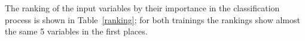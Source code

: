 
The ranking of the input variables by their importance in the classification process is shown in Table~\ref{ranking}; for both trainings the rankings show almost the same 5 variables in the first places.

